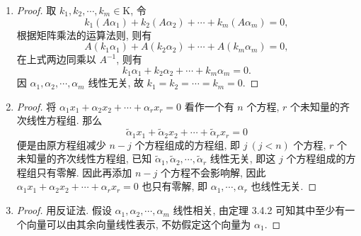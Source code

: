 \begin{enumerate}
\begin{proof}
            若 $\alpha_1, \alpha_2, \cdots, \alpha_m, \beta$ 线性相关. 取 $k_1, \cdots, k_{m+1} \in \mathrm{K}$, 令
            \[
                k_1\alpha_1 + k_2\alpha_2 + \cdots + k_{m}\alpha_m + k_{m+1}\beta = 0,    
            \]
            若 $k_{m+1} = 0$, 即 $k_1\alpha_1 + k_2\alpha_2 + \cdots + k_{m}\alpha_m = 0$, 因 $\alpha_1, \cdots, \alpha_m$ 线性无关, 所以 $k_1 = \cdots = k_m = 0$.
            表明 $\alpha_1, \cdots, \alpha_m, \beta$ 线性无关, 与前提矛盾. 因此必有 $k_{m+1} \not= 0$, 则有
            \[
                \beta = -\frac{k_1}{k_{m+1}}\alpha_1 - \cdots -\frac{k_{m}}{k_{m+1}}\alpha_m,   
            \]
            即 $\beta$ 可由 $\alpha_1, \alpha_2, \cdots, \alpha_m$ 线性表示.
        \end{proof}
    \item %
        \begin{proof}
            取 $k_1, k_2, \cdots, k_m \in \mathrm{K}$, 令
            \[
                k_1(A\alpha_1) + k_2(A\alpha_2) + \cdots + k_m(A\alpha_m) = 0,  
            \]
            根据矩阵乘法的运算法则, 则有
            \[
                A(k_1\alpha_1) + A(k_2\alpha_2) + \cdots + A(k_m\alpha_m) = 0,    
            \]
            在上式两边同乘以 $A^{-1}$, 则有
            \[
                k_1\alpha_1 + k_2\alpha_2 + \cdots + k_m\alpha_m = 0.    
            \]
            因 $\alpha_1, \alpha_2, \cdots, \alpha_m$ 线性无关, 故 $k_1 = k_2 = \cdots = k_m = 0$.
        \end{proof}
    \item %
        \begin{proof}
            将 $\alpha_1x_1 + \alpha_2x_2 + \cdots + \alpha_rx_r = 0$ 看作一个有 $n$ 个方程, $r$ 个未知量的齐次线性方程组.
            那么
            \begin{equation}
                \widetilde{\alpha}_1x_1 + \widetilde{\alpha}_2x_2 + \cdots + \widetilde{\alpha}_rx_r = 0
            \end{equation}
            便是由原方程组减少 $n-j$ 个方程组成的方程组, 即 $j\ (j < n)$ 个方程, $r$ 个未知量的齐次线性方程组, 已知 $\widetilde{\alpha}_1, \widetilde{\alpha}_2, \cdots, \widetilde{\alpha}_r$ 线性无关, 即这 $j$ 个方程组成的方程组只有零解.
            因此再添加 $n-j$ 个方程不会影响解, 因此 $\alpha_1x_1 + \alpha_2x_2 + \cdots + \alpha_rx_r = 0$ 也只有零解, 即 $\alpha_1, \cdots, \alpha_r$ 也线性无关. 
        \end{proof}
    \item %
        \begin{proof}
            用反证法. 假设 $\alpha_1, \alpha_2, \cdots, \alpha_m$ 线性相关, 由定理 3.4.2 可知其中至少有一个向量可以由其余向量线性表示, 不妨假定这个向量为 $\alpha_1$.

\end{proof}
\end{enumerate}
